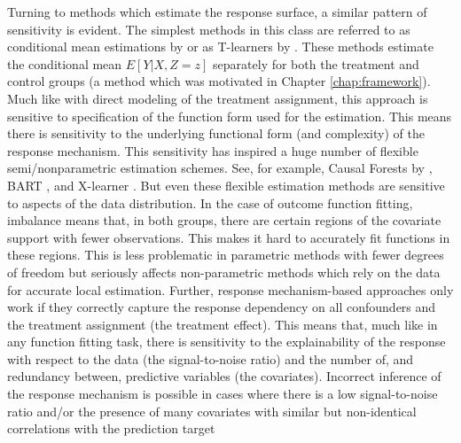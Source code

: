 \documentclass[../main.tex]{subfiles}
\begin{document}
\vspace{\baselineskip}
Turning to methods which estimate the response surface, a similar pattern of sensitivity is evident. The simplest methods in this class are referred to as conditional mean estimations by \cite{Knaus2018MachineEvidence} or as T-learners by \cite{Kunzel2019MetalearnersLearning}. These methods estimate the conditional mean  \( E \left[ Y \vert  X, Z=z \right]  \)  separately for both the treatment and control groups (a method which was motivated in Chapter \ref{chap:framework}). Much like with direct modeling of the treatment assignment, this approach is sensitive to specification of the function form used for the estimation. This means there is sensitivity to the underlying functional form (and complexity) of the response mechanism. This sensitivity has inspired a huge number of flexible semi/nonparametric estimation schemes. See, for example, Causal Forests by \cite{Athey2018ApproximateDimensions}, BART \cite{Hill2011BayesianInference}, and X-learner \cite{Kunzel2019MetalearnersLearning}. But even these flexible estimation methods are sensitive to aspects of the data distribution. In the case of outcome function fitting, imbalance means that, in both groups, there are certain regions of the covariate support with fewer observations. This makes it hard to accurately fit functions in these regions. This is less problematic in parametric methods with fewer degrees of freedom but seriously affects non-parametric methods which rely on the data for accurate local estimation. Further, response mechanism-based approaches only work if they correctly capture the response dependency on all confounders and the treatment assignment (the treatment effect). This means that, much like in any function fitting task, there is sensitivity to the explainability of the response with respect to the data (the signal-to-noise ratio) and the number of, and redundancy between, predictive variables (the covariates). Incorrect inference of the response mechanism is possible in cases where there is a low signal-to-noise ratio and/or the presence of many covariates with similar but non-identical correlations with the prediction target\par
\end{document}
